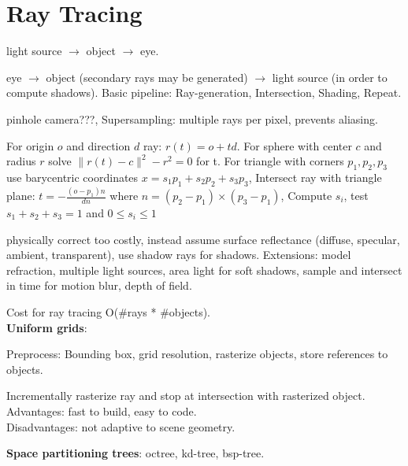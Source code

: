 \section{Ray Tracing}

 light source $\to$ object $\to$ eye.

 eye $\to$ object (secondary rays may be generated) $\to$ light source (in order to compute shadows). Basic pipeline: Ray-generation, Intersection, Shading, Repeat.

 pinhole camera???, Supersampling: multiple rays per pixel, prevents aliasing.

 For origin $o$ and direction $d$ ray: $r(t) = o + td$. For sphere with center $c$ and radius $r$ solve $\|r(t) - c\|^2 - r^2 = 0$ for t. For triangle with corners $p_1, p_2, p_3$ use barycentric coordinates $x = s_1p_1 + s_2p_2 + s_3p_3$, Intersect ray with triangle plane: $t = -\frac{(o-p_1)n}{dn}$ where $n = (p_2 - p_1) \times (p_3 - p_1)$, Compute $s_i$, test $s_1 + s_2 + s_3 = 1$ and $0 \leq s_i \leq 1$

 physically correct too costly, instead assume surface reflectance (diffuse, specular, ambient, transparent), use shadow rays for shadows. Extensions: model refraction,  multiple light sources, area light for soft shadows, sample and intersect in time for motion blur, depth of field.

 Cost for ray tracing O(\#rays * \#objects). \\
\textbf{Uniform grids}:
\begin{compactitem}
    \item Preprocess: Bounding box, grid resolution, rasterize objects, store references to objects. 
    \item Incrementally rasterize ray and stop at intersection with rasterized object. \\Advantages: fast to build, easy to code. 
    \\Disadvantages: not adaptive to scene geometry.
\end{compactitem}
\textbf{Space partitioning trees}: octree, kd-tree, bsp-tree.